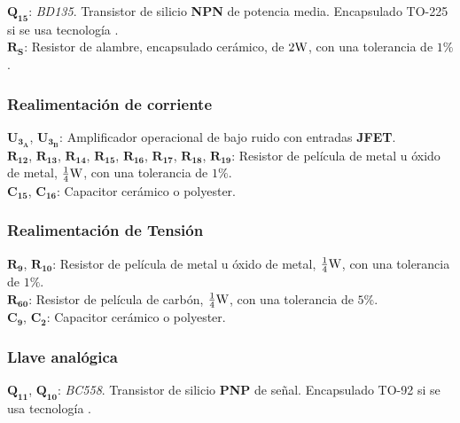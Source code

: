 $\bm{Q_{15}}$: \textit{BD135}. Transistor de silicio \textbf{NPN} de potencia media. Encapsulado TO-225 si se usa tecnología .\\

$\bm{R_{S}}$: Resistor de alambre, encapsulado cerámico, de $2 \si[per-mode=symbol]{\watt}$, con una tolerancia de $1 \%$.\\


\subsubsection{Realimentación de corriente}

$\bm{U_{3_{A}}}$, $\bm{U_{3_{B}}}$: Amplificador operacional de bajo ruido con entradas \textbf{JFET}.\\


$\bm{R_{12}}$, $\bm{R_{13}}$, $\bm{R_{14}}$, $\bm{R_{15}}$, $\bm{R_{16}}$, $\bm{R_{17}}$, $\bm{R_{18}}$, $\bm{R_{19}}$: Resistor de película de metal u óxido de metal, $\frac{1}{4} \si[per-mode=symbol]{\watt}$, con una tolerancia de $1 \%$.\\


$\bm{C_{15}}$, $\bm{C_{16}}$: Capacitor cerámico o polyester.\\ 

\subsubsection{Realimentación de Tensión}

$\bm{R_{9}}$, $\bm{R_{10}}$: Resistor de película de metal u óxido de metal, $\frac{1}{4} \si[per-mode=symbol]{\watt}$, con una tolerancia de $1 \%$.\\

$\bm{R_{60}}$: Resistor de película de carbón, $\frac{1}{4} \si[per-mode=symbol]{\watt}$, con una tolerancia de $5 \%$.\\

$\bm{C_{9}}$, $\bm{C_{2}}$: Capacitor cerámico o polyester.\\ 

\subsubsection{Llave analógica}

$\bm{Q_{11}}$, $\bm{Q_{10}}$: \textit{BC558}. Transistor de silicio \textbf{PNP} de señal. Encapsulado TO-92 si se usa tecnología .\\

